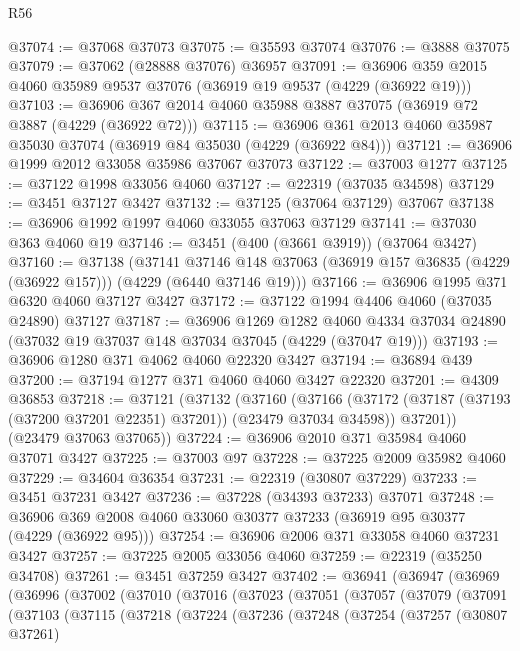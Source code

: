 \begin{lexlean}{R56}
\begin{coremodule}
@37074 := @37068 @37073
@37075 := @35593 @37074
@37076 := @3888 @37075
@37079 := @37062 (@28888 @37076) @36957
@37091 := @36906 @359 @2015 @4060 @35989 @9537 @37076 (@36919 @19 @9537 (@4229 (@36922 @19)))
@37103 := @36906 @367 @2014 @4060 @35988 @3887 @37075 (@36919 @72 @3887 (@4229 (@36922 @72)))
@37115 := @36906 @361 @2013 @4060 @35987 @35030 @37074 (@36919 @84 @35030 (@4229 (@36922 @84)))
@37121 := @36906 @1999 @2012 @33058 @35986 @37067 @37073
@37122 := @37003 @1277
@37125 := @37122 @1998 @33056 @4060
@37127 := @22319 (@37035 @34598)
@37129 := @3451 @37127 @3427
@37132 := @37125 (@37064 @37129) @37067
@37138 := @36906 @1992 @1997 @4060 @33055 @37063 @37129
@37141 := @37030 @363 @4060 @19
@37146 := @3451 (@400 (@3661 @3919)) (@37064 @3427)
@37160 := @37138
    (@37141
      @37146
      @148
      @37063
      (@36919 @157 @36835 (@4229 (@36922 @157)))
      (@4229 (@6440 @37146 @19)))
@37166 := @36906 @1995 @371 @6320 @4060 @37127 @3427
@37172 := @37122 @1994 @4406 @4060 (@37035 @24890) @37127
@37187 := @36906
    @1269
    @1282
    @4060
    @4334
    @37034
    @24890
    (@37032 @19 @37037 @148 @37034 @37045 (@4229 (@37047 @19)))
@37193 := @36906 @1280 @371 @4062 @4060 @22320 @3427
@37194 := @36894 @439
@37200 := @37194 @1277 @371 @4060 @4060 @3427 @22320
@37201 := @4309 @36853
@37218 := @37121
    (@37132
      (@37160
        (@37166
          (@37172 (@37187 (@37193 (@37200 @37201 @22351) @37201)) (@23479 @37034 @34598))
          @37201))
      (@23479 @37063 @37065))
@37224 := @36906 @2010 @371 @35984 @4060 @37071 @3427
@37225 := @37003 @97
@37228 := @37225 @2009 @35982 @4060
@37229 := @34604 @36354
@37231 := @22319 (@30807 @37229)
@37233 := @3451 @37231 @3427
@37236 := @37228 (@34393 @37233) @37071
@37248 := @36906 @369 @2008 @4060 @33060 @30377 @37233 (@36919 @95 @30377 (@4229 (@36922 @95)))
@37254 := @36906 @2006 @371 @33058 @4060 @37231 @3427
@37257 := @37225 @2005 @33056 @4060
@37259 := @22319 (@35250 @34708)
@37261 := @3451 @37259 @3427
@37402 := @36941
    (@36947
      (@36969
        (@36996
          (@37002
            (@37010
              (@37016
                (@37023
                  (@37051
                    (@37057
                      (@37079
                        (@37091
                          (@37103
                            (@37115
                              (@37218
                                (@37224
                                  (@37236
                                    (@37248
                                      (@37254
                                        (@37257
                                          (@30807 @37261)

\end{coremodule}
\end{lexlean}
